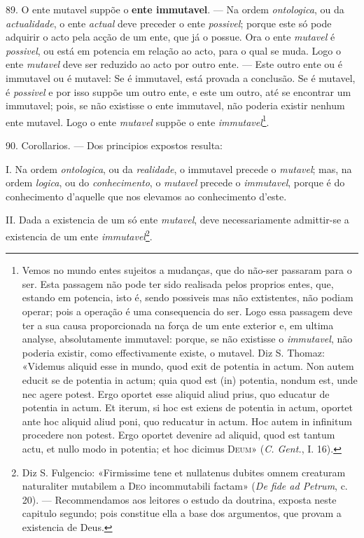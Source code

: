 89. O ente mutavel suppõe o \textbf{ente immutavel}. --- Na ordem \emph{ontologica}, ou da \emph{actualidade}, o ente \emph{actual} deve preceder o ente \emph{possivel}; porque este só pode adquirir o acto pela acção de um   ente, que já o possue. Ora o ente \emph{mutavel} é \emph{possivel}, ou está em potencia em relação ao acto, para o qual se muda. Logo o ente \emph{mutavel} deve ser reduzido ao acto por outro ente. --- Este outro ente ou é immutavel ou é mutavel: Se é immutavel, está provada a conclusão. Se é mutavel, é \emph{possivel} e por isso suppõe um outro ente, e este um outro, até se encontrar um immutavel; pois, se não existisse o ente immutavel, não poderia existir nenhum ente mutavel. Logo o ente \emph{mutavel} suppõe o ente \emph{immutavel}\footnote{Vemos no mundo entes sujeitos a mudanças, que do não-ser passaram para o ser. Esta passagem não pode ter sido realisada pelos proprios entes, que, estando em potencia, isto é, sendo possiveis mas não extistentes, não podiam operar; pois a operação é uma consequencia do ser. Logo essa passagem deve ter a sua causa proporcionada na força de um ente exterior e, em ultima analyse, absolutamente immutavel: porque, se não existisse o \emph{immutavel}, não poderia existir, como effectivamente existe, o mutavel. Diz S. Thomaz: «Videmus aliquid esse in mundo, quod exit de potentia in actum. Non autem educit se de potentia in actum; quia quod est (in) potentia, nondum est, unde nec agere potest. Ergo oportet esse aliquid aliud prius, quo educatur de potentia in actum. Et iterum, si hoc est exiens de potentia in actum, oportet ante hoc aliquid aliud poni, quo reducatur in actum. Hoc autem in infinitum procedere non potest. Ergo oportet devenire ad aliquid, quod est tantum actu, et nullo modo in potentia; et hoc dicimus \textsc{Deum}» (\emph{C. Gent.}, I. 16).}.

90. Corollarios. --- Dos principios expostos resulta:

I. Na ordem \emph{ontologica}, ou da \emph{realidade}, o immutavel precede o \emph{mutavel}; mas, na ordem \emph{logica}, ou do \emph{conhecimento}, o \emph{mutavel} precede o \emph{immutavel}, porque é do conhecimento d'aquelle que nos elevamos ao conhecimento d'este.

II. Dada a existencia de um só ente \emph{mutavel}, deve necessariamente admittir-se a existencia de um ente \emph{immutavel}\footnote{Diz S. Fulgencio: «Firmissime tene et nullatenus dubites omnem creaturam naturaliter mutabilem a \textsc{Deo} incommutabili factam» (\emph{De fide ad Petrum}, c. 20). --- Recommendamos aos leitores o estudo da doutrina, exposta neste capitulo segundo; pois constitue ella a base dos argumentos, que provam a existencia de Deus.}.
